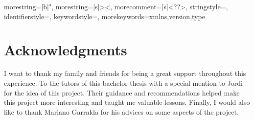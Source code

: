 \documentclass[11pt, a4paper]{article}
\author{Àiax Faura Vilalta}
\date{30th of June, 2022}
\newcommand{\tr}{\IfLanguageName{english}}
\begin{document}

{
	morestring=[b]",
	morestring=[s]{>}{<},
	morecomment=[s]{<?}{?>},
	stringstyle=\color{black},
	identifierstyle=\color{darkblue},
	keywordstyle=\color{cyan},
	morekeywords={xmlns,version,type}%
}


  		
     	
     	
\tableofcontents
\thispagestyle{empty} 
\newpage
\listoffigures
\listoftables
\thispagestyle{empty}
\newpage
\section*{Acknowledgments}
I want to thank my family and friends for being a great support throughout this experience. To the tutors of this bachelor thesis with a special mention to Jordi for the idea of this project. Their guidance and recommendations helped make this project more interesting and taught me valuable lessons. Finally, I would also like to thank Mariano Garralda for his advices on some aspects of the project.
\newpage
\end{document}
